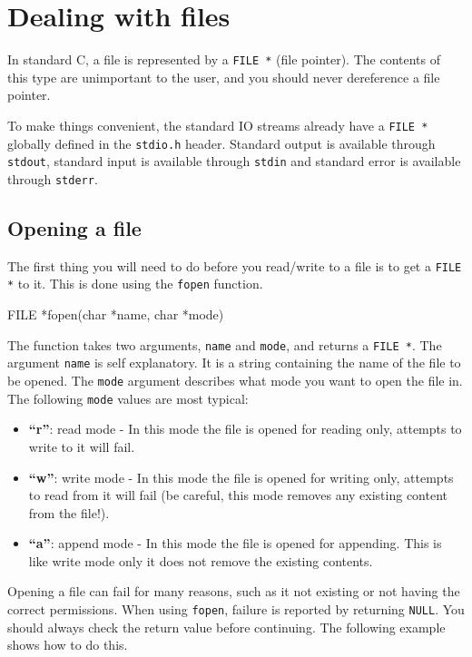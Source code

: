 \chapter{Dealing with files}

In standard C, a file is represented by a \texttt{FILE *} (file pointer).
The contents of this type are unimportant to the user, and you should never dereference a file pointer.

To make things convenient, the standard IO streams already have a \texttt{FILE *} globally defined in the \texttt{stdio.h} header.
Standard output is available through \texttt{stdout}, standard input is available through \texttt{stdin} and standard error is available through \texttt{stderr}.

\section{Opening a file}

The first thing you will need to do before you read/write to a file is to get a \texttt{FILE *} to it.
This is done using the \texttt{fopen} function.

\begin{codeinline}
FILE *fopen(char *name, char *mode)
\end{codeinline}

The function takes two arguments, \texttt{name} and \texttt{mode}, and returns a \texttt{FILE *}.
The argument \texttt{name} is self explanatory. It is a string containing the name of the file to be opened.
The \texttt{mode} argument describes what mode you want to open the file in.
The following \texttt{mode} values are most typical:

\begin{itemize}
  \item{\textbf{``r''}:} read mode - In this mode the file is opened for reading only, attempts to write to it will fail.
  \item{\textbf{``w''}:} write mode - In this mode the file is opened for writing only, attempts to read from it will fail (be careful, this mode removes any existing content from the file!).
  \item{\textbf{``a''}:} append mode - In this mode the file is opened for appending. This is like write mode only it does not remove the existing contents.
\end{itemize}

Opening a file can fail for many reasons, such as it not existing or not having the correct permissions.
When using \texttt{fopen}, failure is reported by returning \texttt{NULL}.
You should always check the return value before continuing.
The following example shows how to do this.

